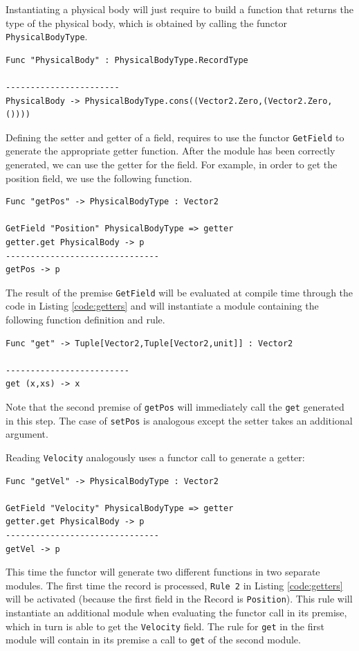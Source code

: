 Instantiating a physical body will just require to build a function that returns the type of the physical body, which is obtained by calling the functor \texttt{PhysicalBodyType}.

\begin{lstlisting}
Func "PhysicalBody" : PhysicalBodyType.RecordType

-----------------------
PhysicalBody -> PhysicalBodyType.cons((Vector2.Zero,(Vector2.Zero,())))
\end{lstlisting}

Defining the setter and getter of a field, requires to use the functor \texttt{GetField} to generate the appropriate getter function. After the module has been correctly generated, we can use the getter for the field. For example, in order to get the position field, we use the following function.

\begin{lstlisting}
Func "getPos" -> PhysicalBodyType : Vector2

GetField "Position" PhysicalBodyType => getter
getter.get PhysicalBody -> p
-------------------------------
getPos -> p
\end{lstlisting}

The result of the premise \texttt{GetField} will be evaluated at compile time through the code in Listing \ref{code:getters} and will instantiate a module containing the following function definition and rule.

\begin{lstlisting}
Func "get" -> Tuple[Vector2,Tuple[Vector2,unit]] : Vector2

-------------------------
get (x,xs) -> x
\end{lstlisting}

\noindent
Note that the second premise of \texttt{getPos} will immediately call the \texttt{get} generated in this step. The case of \texttt{setPos} is analogous except the setter takes an additional argument.

Reading \texttt{Velocity} analogously uses a functor call to generate a getter:

\begin{lstlisting}
Func "getVel" -> PhysicalBodyType : Vector2

GetField "Velocity" PhysicalBodyType => getter
getter.get PhysicalBody -> p
-------------------------------
getVel -> p
\end{lstlisting}

\noindent
This time the functor will generate two different functions in two separate modules. The first time the record is processed, \texttt{Rule 2} in Listing \ref{code:getters} will be activated (because the first field in the Record is \texttt{Position}). This rule will instantiate an additional module when evaluating the functor call in its premise, which in turn is able to get the \texttt{Velocity} field. The rule for \texttt{get} in the first module will contain in its premise a call to  \texttt{get} of the second module.

